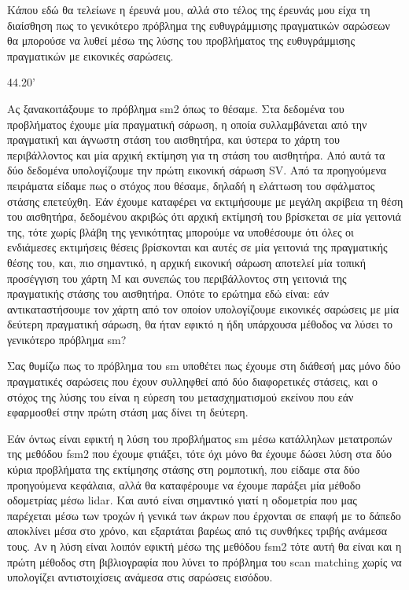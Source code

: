 \documentclass[a4paper,10pt]{article}
\begin{document}
Κάπου εδώ θα τελείωνε η έρευνά μου, αλλά στο τέλος της έρευνάς μου είχα τη
διαίσθηση πως το γενικότερο πρόβλημα της ευθυγράμμισης πραγματικών σαρώσεων θα
μπορούσε να λυθεί μέσω της λύσης του προβλήματος της ευθυγράμμισης πραγματικών
με εικονικές σαρώσεις.

44.20'



Ας ξανακοιτάξουμε το πρόβλημα sm2 όπως το θέσαμε. Στα δεδομένα του προβλήματος
έχουμε μία πραγματική σάρωση, η οποία συλλαμβάνεται από την πραγματική και
άγνωστη στάση του αισθητήρα, και ύστερα το χάρτη του περιβάλλοντος και μία
αρχική εκτίμηση για τη στάση του αισθητήρα. Από αυτά τα δύο δεδομένα υπολογίζουμε
την πρώτη εικονική σάρωση SV. Από τα προηγούμενα πειράματα είδαμε πως ο
στόχος που θέσαμε, δηλαδή η ελάττωση του σφάλματος στάσης επετεύχθη. Εάν έχουμε
καταφέρει να εκτιμήσουμε με μεγάλη ακρίβεια τη θέση του αισθητήρα, δεδομένου
ακριβώς ότι αρχική εκτίμησή του βρίσκεται σε μία γειτονιά της, τότε χωρίς
βλάβη της γενικότητας μπορούμε να υποθέσουμε ότι όλες οι ενδιάμεσες εκτιμήσεις
θέσεις βρίσκονται και αυτές σε μία γειτονιά της πραγματικής θέσης του, και,
πιο σημαντικό, η αρχική εικονική σάρωση αποτελεί μία τοπική προσέγγιση του
χάρτη M και συνεπώς του περιβάλλοντος στη γειτονιά της πραγματικής στάσης του
αισθητήρα. Οπότε το ερώτημα εδώ είναι: εάν αντικαταστήσουμε τον χάρτη από τον
οποίον υπολογίζουμε εικονικές σαρώσεις με μία δεύτερη πραγματική σάρωση, θα ήταν
εφικτό η ήδη υπάρχουσα μέθοδος να λύσει το γενικότερο πρόβλημα sm?

Σας θυμίζω πως το πρόβλημα του sm υποθέτει πως έχουμε στη διάθεσή μας μόνο
δύο πραγματικές σαρώσεις που έχουν συλληφθεί από δύο διαφορετικές στάσεις, και
ο στόχος της λύσης του είναι η εύρεση του μετασχηματισμού εκείνου που εάν
εφαρμοσθεί στην πρώτη στάση μας δίνει τη δεύτερη.

Εάν όντως είναι εφικτή η λύση του προβλήματος sm μέσω κατάλληλων μετατροπών της
μεθόδου fsm2 που έχουμε φτιάξει, τότε όχι μόνο θα έχουμε δώσει λύση στα δύο
κύρια προβλήματα της εκτίμησης στάσης στη ρομποτική, που είδαμε στα δύο
προηγούμενα κεφάλαια, αλλά θα καταφέρουμε να έχουμε παράξει μία μέθοδο
οδομετρίας μέσω lidar. Και αυτό είναι σημαντικό γιατί η οδομετρία που μας
παρέχεται μέσω των τροχών ή γενικά των άκρων που έρχονται σε επαφή με το δάπεδο
αποκλίνει μέσα στο χρόνο, και εξαρτάται βαρέως από τις συνθήκες τριβής ανάμεσα
τους. Αν η λύση είναι λοιπόν εφικτή μέσω της μεθόδου fsm2 τότε αυτή θα είναι
και η πρώτη μέθοδος στη βιβλιογραφία που λύνει το πρόβλημα του scan matching
χωρίς να υπολογίζει αντιστοιχίσεις ανάμεσα στις σαρώσεις εισόδου.
\end{document}
